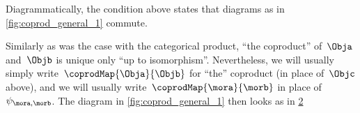\begin{remark}
    Diagrammatically, the condition above states that diagrams as in \cref{fig:coprod_general_1} commute.
    \begin{figure}[h!]
        \centering
        \caption{}
        \label{fig:coprod_general_1}
        \label{fig:def-coproduct-diagram}
    \end{figure}
    Similarly as was the case with the categorical product, ``the coproduct'' of~$\Obja$ and~$\Objb$ is unique only ``up to isomorphism''.
    Nevertheless, we will usually simply write~$\coprodMap{\Obja}{\Objb}$ for ``the'' coproduct (in place of~$\Objc$ above), and we will usually write~$\coprodMap{\mora}{\morb}$ in place of~$\psi_{\mora, \morb}$.
    The diagram in \cref{fig:coprod_general_1} then looks as in \cref{fig:def-coproduct-diagram-generic}
\end{remark}

\begin{figure}
    \centering
    \caption{}
    \label{fig:def-coproduct-diagram-generic}
\end{figure}
%
%

%



